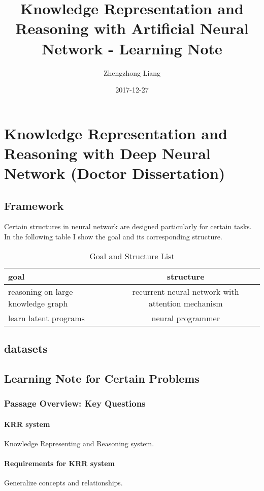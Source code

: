 \documentclass{article}
\title{Knowledge Representation and Reasoning with Artificial Neural Network - Learning Note}
\author{Zhengzhong Liang}
\date{2017-12-27}
\begin{document}
\maketitle
\section{Knowledge Representation and Reasoning with Deep Neural Network (Doctor Dissertation)}
\subsection{Framework}
Certain structures in neural network are designed particularly for certain tasks. In the following table I show the goal and its corresponding structure.
\begin{table}[!h]
\caption{Goal and Structure List}
\centering
\begin{tabular}{| l | c | r |} \hline
goal & \multicolumn{2}{p{6cm}|}{\raggedright structure} \\ \hline
reasoning on large knowledge graph & \multicolumn{2}{p{6cm}|}{\raggedright recurrent neural network with attention mechanism} \\ \hline
learn latent programs & \multicolumn{2}{p{6cm}|}{\raggedright  neural programmer} \\ \hline
\end{tabular}
\label{tab:exp_ProcessFlow_1}
\end{table}

\subsection{datasets}
\subsection{Learning Note for Certain Problems}
\subsubsection{Passage Overview: Key Questions}
\paragraph{KRR system} Knowledge Representing and Reasoning system.
\paragraph{Requirements for KRR system} Generalize concepts and relationships.
\end{document}
